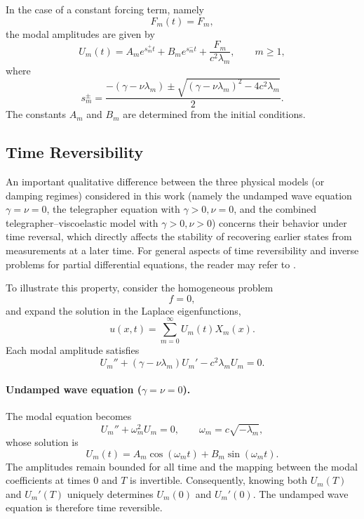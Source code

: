 \documentclass{Configuration_Files/PoliMi3i_thesis}
\newif\ifshowthesischanges
\DeclareRobustCommand{\thesischange}[2]{%
    \ifshowthesischanges
        \textcolor{#1}{#2}%
    \else
        #2%
    \fi
}
\def\thesischange#1#2{#2}%
\begin{document}
In the case of a constant forcing term, namely
\begin{equation*}
F_m(t)=F_m,
\end{equation*}
the modal amplitudes are given by
\begin{equation*}
U_m(t)
=
A_me^{s_m^+t}
+
B_me^{s_m^-t}
+
\frac{F_m}{c^2\lambda_m},
\qquad
m\ge1,
\end{equation*}
where
\begin{equation*}
s_m^\pm
=
\frac{
-\left(\gamma-\nu\lambda_m\right)
\pm
\sqrt{
\left(\gamma-\nu\lambda_m\right)^2
-
4c^2\lambda_m
}
}{2}.
\end{equation*}
The constants $A_m$ and $B_m$ are determined from the initial conditions.

\subsection{Time Reversibility}

\thesischange{red}{An important qualitative difference between the three physical models (or damping regimes) considered in this work (namely the undamped wave equation $\gamma=\nu=0$, the telegrapher equation with $\gamma>0, \nu=0$, and the combined telegrapher--viscoelastic model with $\gamma>0, \nu>0$) concerns their behavior under time reversal}, which directly affects the stability of recovering earlier states from measurements at a later time. For general aspects of time reversibility and inverse problems for partial differential equations, the reader may refer to \cite{isakov_inverse_2006}.

To illustrate this property, consider the homogeneous problem
\begin{equation*}
f=0,
\end{equation*}
and expand the solution in the Laplace eigenfunctions,
\begin{equation*}
u(x,t)
=
\sum_{m=0}^{\infty}
U_m(t)X_m(x).
\end{equation*}
Each modal amplitude satisfies
\begin{equation*}
U_m''
+
(\gamma-\nu\lambda_m)U_m'
-
c^2\lambda_mU_m
=
0.
\end{equation*}

\paragraph{Undamped wave equation (\(\gamma=\nu=0\)).}

The modal equation becomes
\begin{equation*}
U_m''
+
\omega_m^2U_m
=
0,
\qquad
\omega_m
=
c\sqrt{-\lambda_m},
\end{equation*}
whose solution is
\begin{equation*}
U_m(t)
=
A_m\cos(\omega_mt)
+
B_m\sin(\omega_mt).
\end{equation*}
The amplitudes remain bounded for all time and the mapping between the modal coefficients at times \(0\) and \(T\) is invertible. Consequently, knowing both \(U_m(T)\) and \(U_m'(T)\) uniquely determines \(U_m(0)\) and \(U_m'(0)\). The undamped wave equation is therefore time reversible.
\end{document}
